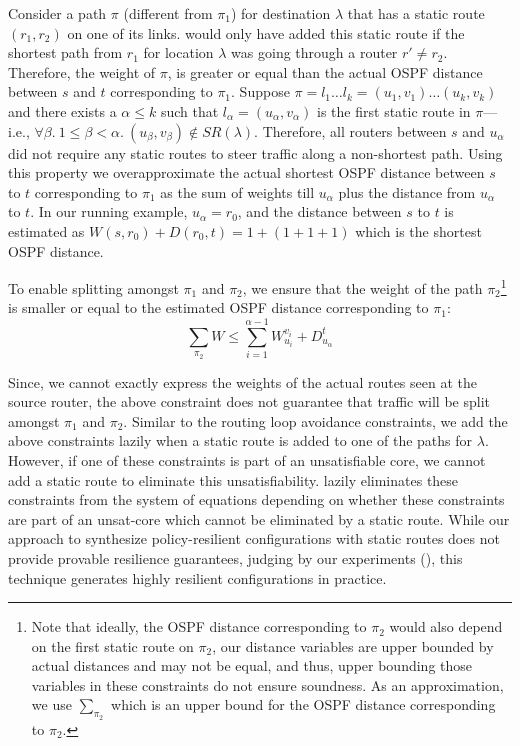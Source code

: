 Consider a path $\pi$ (different from $\pi_1$) for destination $\lambda$
that has  a  static route $(r_1, r_2)$ on one of its links.
\name would only have added this static route
if the shortest path from $r_1$ for location $\lambda$
was going through  a
router $r' \not= r_2$. 
Therefore, the weight of $\pi$,
 is greater or equal than the 
actual OSPF distance
between $s$ and $t$ corresponding to $\pi_1$. 
Suppose $\pi = l_1 \ldots l_k = (u_1, v_1) \ldots (u_k, v_k)$ 
and 
there exists a $\alpha \leq k$ such that 
$l_\alpha = (u_\alpha, v_\alpha)$  
is the first 
static route in $\pi$---i.e., 
$\forall \beta. ~1 \leq \beta < \alpha. ~(u_\beta, v_\beta) \not\in SR(\lambda)$.
Therefore, all routers between $s$ and $u_\alpha$ did
not require any static routes to steer traffic along a 
non-shortest path. 
Using this property we overapproximate
the
actual shortest OSPF distance  between $s$ to $t$ 
corresponding to $\pi_1$ 
as the sum of weights till $u_\alpha$ plus the distance
from $u_\alpha$ to $t$. In our running example, 
$u_\alpha = r_0$, and the distance between $s$ to $t$ 
is estimated as $W(s, r_0) + D(r_0, t) = 1 + (1 + 1 + 1)$
which is the shortest OSPF distance. 

To enable splitting amongst
$\pi_1$ and $\pi_2$, we ensure that the weight 
of the path $\pi_2$\footnote{
Note that ideally, the OSPF distance corresponding to 
$\pi_2$ would also depend on the first static route on
$\pi_2$, our distance variables are upper bounded by actual
distances and may not be equal, and thus, upper bounding 
those variables in these constraints do not ensure soundness.
As an approximation, we use $\sum_{\pi_2}$ which is an upper bound
for the OSPF distance corresponding to 
$\pi_2$. 
} 
is smaller or equal to 
the estimated OSPF distance corresponding to $\pi_1$: 
\begin{equation}
	\sum_{\pi_2} W \leq \sum_{i=1}^{\alpha - 1} W_{u_i}^{v_i} + D_{u_\alpha}^t	
\end{equation}

Since, we cannot exactly express the weights of the actual routes seen 
at the source router, the above constraint does not  guarantee 
that traffic will be split amongst
$\pi_1$ and $\pi_2$. 
Similar to the routing loop avoidance constraints, we add the
above constraints lazily when a static route is added to one of the
paths for $\lambda$. However, if one of these constraints is part of 
an unsatisfiable core, we cannot add a static route to eliminate 
this unsatisfiability. \name lazily eliminates these constraints from the
system of equations depending on whether these constraints are part of 
an unsat-core which cannot be eliminated by a static route. 
While our approach to synthesize policy-resilient 
configurations with static routes does not provide provable resilience guarantees, 
judging by our experiments (), 
this technique generates highly resilient configurations 
in practice. 
